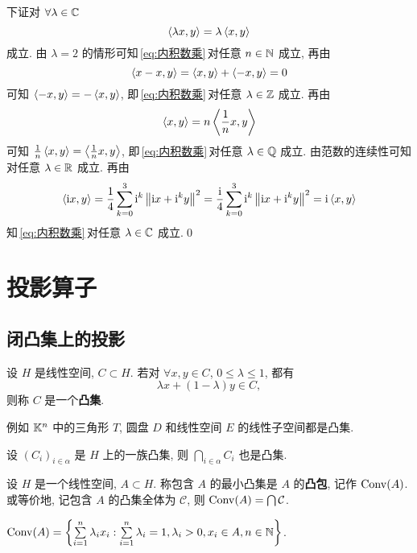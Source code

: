 \begin{Proof}
	下证对 $ \forall\lambda\in\mathbb{C} $
	\begin{equation}\label{eq:内积数乘}
		\left\langle \lambda x, y \right\rangle=\lambda\left\langle x, y \right\rangle
	\end{equation}
	成立. 由 $ \lambda=2 $ 的情形可知\,\eqref{eq:内积数乘}\,对任意 $ n\in\mathbb{N} $ 成立, 再由
	\[
		\left\langle x-x, y \right\rangle=\left\langle x, y \right\rangle+\left\langle -x, y \right\rangle=0
	\]
	可知 $ \left\langle -x, y \right\rangle=-\left\langle x, y \right\rangle $, 即\,\eqref{eq:内积数乘}\,对任意 $ \lambda\in\mathbb{Z} $ 成立. 再由
	\[
		\left\langle x, y \right\rangle=n\left\langle \frac{1}{n}x, y \right\rangle
	\]
	可知 $ \frac{1}{n}\left\langle x, y \right\rangle=\left\langle \frac{1}{n}x, y \right\rangle $, 即\,\eqref{eq:内积数乘}\,对任意 $ \lambda\in\mathbb{Q} $ 成立. 由范数的连续性可知对任意 $ \lambda\in\mathbb{R} $ 成立. 再由
	\[
		\left\langle \mathrm{i} x, y \right\rangle=\frac{1}{4}\sum_{k=0}^{3}\mathrm{i}^{k}\left\| \mathrm{i} x+\mathrm{i}^{k}y \right\|^{2}=\frac{\mathrm{i}}{4}\sum_{k=0}^{3}\mathrm{i}^{k}\left\| \mathrm{i} x+\mathrm{i}^{k}y \right\|^{2}=\mathrm{i}\left\langle x, y \right\rangle
	\]
	知\,\eqref{eq:内积数乘}\,对任意 $ \lambda\in\mathbb{C} $ 成立.\qed
\end{Proof}

\section{投影算子}
\subsection{闭凸集上的投影}

\begin{Definition}[凸集]\label{def:凸集}
	设 $ H $ 是线性空间, $ C\subset H $. 若对 $ \forall x, y\in C $, $ 0\leqslant\lambda\leqslant1 $, 都有
	\[
		\lambda x+(1-\lambda)y\in C,
	\]
	则称 $ C $ 是一个\textbf{凸集}.
\end{Definition}
例如 $ \mathbb{K}^{n} $ 中的三角形 $ T $, 圆盘 $ D $ 和线性空间 $ E $ 的线性子空间都是凸集.

\begin{Proposition}
	设 $ (C_{i})_{i\in\alpha} $ 是 $ H $ 上的一族凸集, 则 $ \bigcap_{i\in\alpha}C_{i} $ 也是凸集.
\end{Proposition}

\begin{Definition}[凸包]\label{def:凸包}
	设 $ H $ 是一个线性空间, $ A\subset H $. 称包含 $ A $ 的最小凸集是 $ A $ 的\textbf{凸包}, 记作 $ \operatorname{Conv}(A) $. 或等价地, 记包含 $ A $ 的凸集全体为 $ \mathcal{C} $, 则 $ \operatorname{Conv}(A)=\bigcap \mathcal{C} $.
\end{Definition}

\begin{Proposition}
	$ \operatorname{Conv}(A)=\left\{ \sum\limits_{i=1}^{n}\lambda_{i}x_{i}:\sum\limits_{i=1}^{n}\lambda_{i}=1, \lambda_{i}>0, x_{i}\in A, n\in \mathbb{N} \right\} $.
\end{Proposition}

